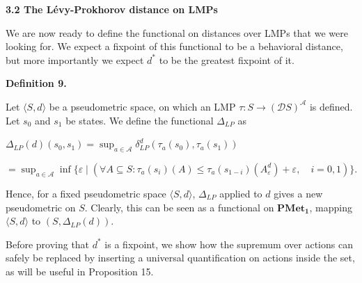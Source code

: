 \documentclass[10pt,a4paper]{article}
\begin{document}
 
 
 
\par\medskip\noindent\textbf{3.2 The Lévy-Prokhorov distance on LMPs}\par
 
 
We are now ready to define the functional on distances over LMPs that we were looking for. We expect a fixpoint of this functional to be a behavioral distance, but more importantly we expect $d^{*}$ to be the greatest fixpoint of it.\par
 
 
 
\par\medskip\noindent\textbf{Definition 9.}\par
 
 
Let $\langle S,d\rangle$ be a pseudometric space, on which an LMP $\tau:S\to(\mathcal{D}S)^{\mathcal{A}}$ is defined. Let $s_{0}$ and $s_{1}$ be states. We define the functional $\Delta_{LP}$ as\par
  
\par  \quad  $\displaystyle\Delta_{LP}(d)(s_{0},s_{1})$\quad  $\displaystyle=\sup_{a\in\mathcal{A}}\delta_{LP}^{d}(\tau_{a}(s_{0}),\tau_{a}(s_{1}))$\quad  \quad  
 
\par  \quad  \quad  $\displaystyle=\sup_{a\in\mathcal{A}}\inf\{\varepsilon\mid(\forall A\subseteq S:\tau_{a}(s_{i})(A)\leq\tau_{a}(s_{1-i})(A^{d}_{\varepsilon})+\varepsilon,\quad i=0,1)\}.$\quad  \quad  
  
 
 
 
Hence, for a fixed pseudometric space $\langle S,d\rangle$, $\Delta_{LP}$ applied to $d$ gives a new pseudometric on $S$. Clearly, this can be seen as a functional on $\mathbf{PMet_{1}}$, mapping $\langle S,d\rangle$ to $(S,\Delta_{LP}(d))$.\par
 
 
 
Before proving that $d^{*}$ is a fixpoint, we show how the supremum over actions can safely be replaced by inserting a universal quantification on actions inside the set, as will be useful in Proposition 15.\par
 
\end{document}
